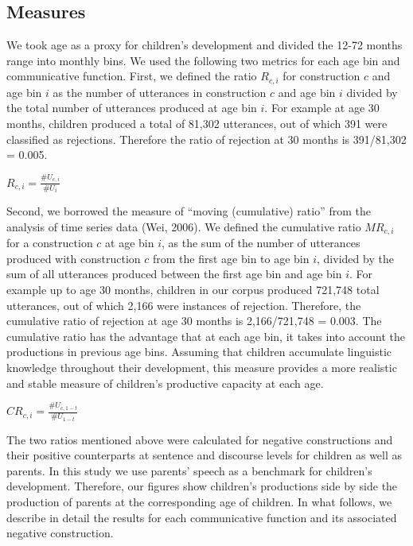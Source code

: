 \documentclass[
  english,
  man,floatsintext]{apa6}
\begin{document}
\hypertarget{measures}{%
\subsection{Measures}\label{measures}}

We took age as a proxy for children's development and divided the 12-72 months range into monthly bins. We used the following two metrics for each age bin and communicative function. First, we defined the ratio \(R_{c,i}\) for construction \(c\) and age bin \(i\) as the number of utterances in construction \(c\) and age bin \(i\) divided by the total number of utterances produced at age bin \(i\). For example at age 30 months, children produced a total of 81,302 utterances, out of which 391 were classified as rejections. Therefore the ratio of rejection at 30 months is 391/81,302 = 0.005.

\(R_{c, i} = \frac{\#U_{c,i}}{\#U_{i}}\)

Second, we borrowed the measure of ``moving (cumulative) ratio'' from the analysis of time series data (Wei, 2006). We defined the cumulative ratio \(MR_{c,i}\) for a construction \(c\) at age bin \(i\), as the sum of the number of utterances produced with construction \(c\) from the first age bin to age bin \(i\), divided by the sum of all utterances produced between the first age bin and age bin \(i\). For example up to age 30 months, children in our corpus produced 721,748 total utterances, out of which 2,166 were instances of rejection. Therefore, the cumulative ratio of rejection at age 30 months is 2,166/721,748 = 0.003. The cumulative ratio has the advantage that at each age bin, it takes into account the productions in previous age bins. Assuming that children accumulate linguistic knowledge throughout their development, this measure provides a more realistic and stable measure of children's productive capacity at each age.

\(CR_{c, i} = \frac{\#U_{c,1-t}}{\#U_{1-t}}\)

The two ratios mentioned above were calculated for negative constructions and their positive counterparts at sentence and discourse levels for children as well as parents. In this study we use parents' speech as a benchmark for children's development. Therefore, our figures show children's productions side by side the production of parents at the corresponding age of children. In what follows, we describe in detail the results for each communicative function and its associated negative construction.
\end{document}
